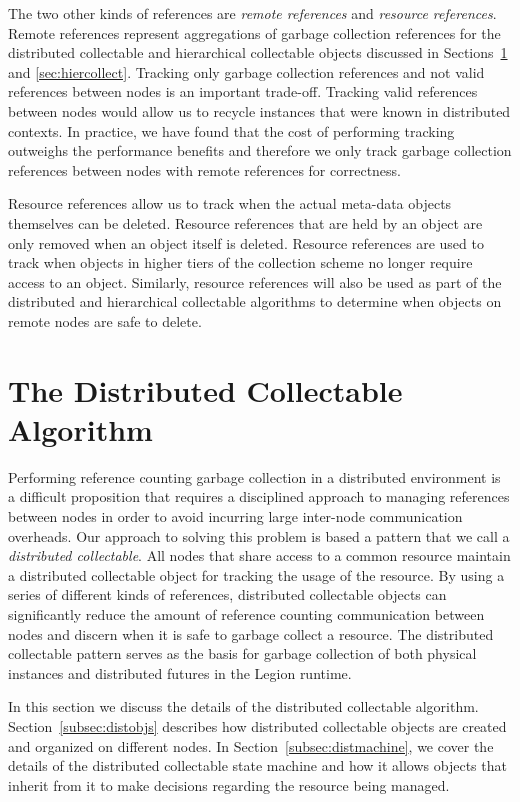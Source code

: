 The two other kinds of references are {\em remote
references} and {\em resource references}. Remote references
represent aggregations of garbage collection references
for the distributed collectable and hierarchical collectable
objects discussed in Sections~\ref{sec:distcollect} and
\ref{sec:hiercollect}. Tracking only garbage collection
references and not valid references between nodes is an
important trade-off. Tracking valid references between nodes
would allow us to recycle instances that were known in 
distributed contexts. In practice, we have found that the cost
of performing tracking outweighs the performance benefits
and therefore we only track garbage collection references
between nodes with remote references for correctness.

Resource references allow us to track when the actual
meta-data objects themselves can be deleted. Resource 
references that are held by an object are only removed 
when an object itself is deleted. Resource references
are used to track when objects in higher tiers of the
collection scheme no longer require access to an object.
Similarly, resource references will also be used as 
part of the distributed and hierarchical collectable
algorithms to determine when objects on remote nodes
are safe to delete. 

\section{The Distributed Collectable Algorithm}
\label{sec:distcollect}
Performing reference counting garbage collection
in a distributed environment is a difficult 
proposition that requires a disciplined approach
to managing references between nodes in order to 
avoid incurring large inter-node communication 
overheads. Our approach to solving this problem 
is based a pattern that we call a {\em distributed 
collectable}. All nodes
that share access to a common resource maintain
a distributed collectable object for tracking
the usage of the resource.  By using a series
of different kinds of references, distributed
collectable objects can significantly reduce
the amount of reference counting communication
between nodes and discern when it is safe to
garbage collect a resource. The distributed
collectable pattern serves as the basis for
garbage collection of both physical instances
and distributed futures in the Legion runtime.

In this section we discuss the details of the 
distributed collectable algorithm. 
Section~\ref{subsec:distobjs} 
describes how distributed collectable objects
are created and organized on different nodes.
In Section~\ref{subsec:distmachine},
we cover the details of the distributed 
collectable state machine and how it allows
objects that inherit from it to make decisions
regarding the resource being managed.

